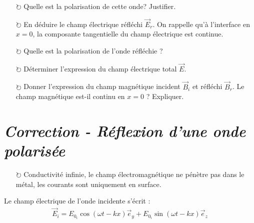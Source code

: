 \documentclass{report}
\begin{document}
\begin{itemize}

	\item[$\circlearrowright$] Quelle est la polarisation de cette onde? Justifier. 
	
	\item[$\circlearrowright$] En déduire le champ électrique réfléchi $\vec{E}_r$. On rappelle qu'à l'interface en $x=0$, la composante tangentielle du champ électrique est continue.
	
	\item[$\circlearrowright$] Quelle est la polarisation de l'onde réfléchie ? 
	
	\item[$\circlearrowright$] Déterminer l'expression du champ électrique total $\vec{E}$.
	
	\item[$\circlearrowright$] Donner l'expression du champ magnétique incident $\vec{B}_i$ et réfléchi $\vec{B}_r$. Le champ magnétique est-il continu en $x=0$ ? Expliquer. 

\end{itemize}

\newpage

\section*{\textit{Correction - Réflexion d'une onde polarisée}}

\begin{itemize}

	\item[$\circlearrowright$] Conductivité infinie, le champ électromagnétique ne pénètre pas dans le métal, les courants sont uniquement en surface.

\end{itemize}

Le champ électrique de l'onde incidente s'écrit :
\begin{align*}
	\vec{E}_i=E_{0_i}\cos(\omega t -kx)\vec{e}_y+E_{0_i}\sin(\omega t -kx)\vec{e}_z
\end{align*}
\end{document}

